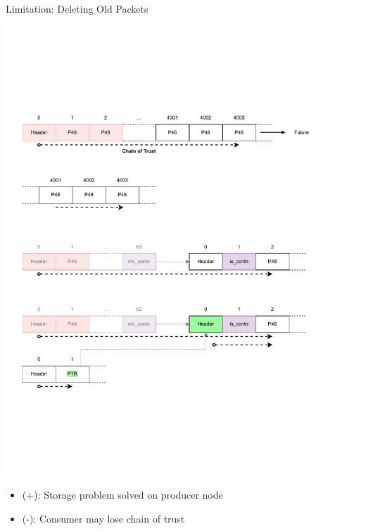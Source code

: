 \documentclass[aspectratio=169]{beamer}
\begin{document}
\begin{frame}[c]{Limitation: Deleting Old Packets}
\includegraphics[width=1\textwidth]{images/session_2.pdf}
\begin{itemize}
	\item (+): Storage problem solved on producer node
	\item (-): Consumer may lose chain of trust
\end{itemize}
\end{frame}
\end{document}

